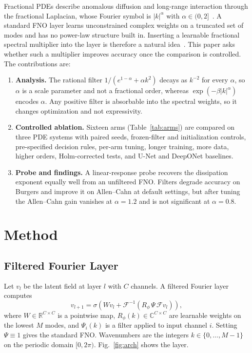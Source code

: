 \documentclass[conference]{IEEEtran}
\newcommand{\Fcal}{\mathcal{F}}
\begin{document}
Fractional PDEs describe anomalous diffusion and long-range interaction through the fractional Laplacian, whose Fourier symbol is $|k|^{\alpha}$ with $\alpha\in(0,2]$~\cite{podlubny1999fractional,metzler2000random,lischke2020fractional,kwasnicki2017ten}. A standard FNO layer learns unconstrained complex weights on a truncated set of modes and has no power-law structure built in. Inserting a learnable fractional spectral multiplier into the layer is therefore a natural idea~\cite{mehouachi2026fractional}. This paper asks whether such a multiplier improves accuracy once the comparison is controlled. The contributions are:
\begin{enumerate}
\item \textbf{Analysis.} The rational filter $1/(e^{1-\alpha}+\alpha k^2)$ decays as $k^{-2}$ for every $\alpha$, so $\alpha$ is a scale parameter and not a fractional order, whereas $\exp(-\beta|k|^{\alpha})$ encodes $\alpha$. Any positive filter is absorbable into the spectral weights, so it changes optimization and not expressivity.
\item \textbf{Controlled ablation.} Sixteen arms (Table~\ref{tab:arms}) are compared on three PDE systems with paired seeds, frozen-filter and initialization controls, pre-specified decision rules, per-arm tuning, longer training, more data, higher orders, Holm-corrected tests, and U-Net and DeepONet baselines.
\item \textbf{Probe and findings.} A linear-response probe recovers the dissipation exponent equally well from an unfiltered FNO. Filters degrade accuracy on Burgers and improve it on Allen--Cahn at default settings, but after tuning the Allen--Cahn gain vanishes at $\alpha=1.2$ and is not significant at $\alpha=0.8$.
\end{enumerate}

\section{Method}
\subsection{Filtered Fourier Layer}
Let $v_l$ be the latent field at layer $l$ with $C$ channels. A filtered Fourier layer computes
\begin{equation}
v_{l+1}=\sigma\!\left(W v_l+\Fcal^{-1}\!\left(R_\phi\,\Psi\,\Fcal v_l\right)\right),
\label{eq:layer}
\end{equation}
where $W\in\mathbb{R}^{C\times C}$ is a pointwise map, $R_\phi(k)\in\mathbb{C}^{C\times C}$ are learnable weights on the lowest $M$ modes, and $\Psi_i(k)$ is a filter applied to input channel $i$. Setting $\Psi\equiv 1$ gives the standard FNO. Wavenumbers are the integers $k\in\{0,\dots,M-1\}$ on the periodic domain $[0,2\pi)$. Fig.~\ref{fig:arch} shows the layer.
\end{document}
